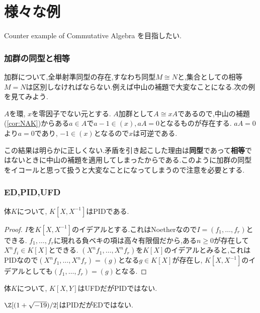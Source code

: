 \part[Appendix \thepart, Various Example]{様々な例}

Counter example of Commutative Algebra を目指したい.

\section{加群の同型と相等}

加群について,全単射準同型の存在,すなわち同型$M\cong N$と,集合としての相等$M=N$は区別しなければならない.例えば中山の補題で大変なことになる.次の例を見てみよう.

\begin{ex}
	$A$を環, $x$を零因子でない元とする. $A$加群として$A\cong xA$であるので,中山の補題(\ref{cor:NAK})からある$a\in A$で$a-1\in(x),aA=0$となるものが存在する. $aA=0$より$a=0$であり, $-1\in (x)$となるので$x$は可逆である.
\end{ex}

この結果は明らかに正しくない.矛盾を引き起こした理由は\textbf{同型}であって\textbf{相等}ではないときに中山の補題を適用してしまったからである.このように加群の同型をイコールと思って扱うと大変なことになってしまうので注意を必要とする.
\section{ED,PID,UFD}
\begin{surex}
	体$K$について, $K[X,X^{-1}]$はPIDである.
\end{surex}

\begin{proof}
	$I$を$K[X,X^{-1}]$のイデアルとする.これはNoetherなので$I=(f_1,\dots,f_r)$とできる. $f_1,\dots,f_r$に現れる負ベキの項は高々有限個だから,ある$n\geq0$が存在して$X^nf_i\in K[X]$とできる. $(X^nf_1,\dots,X^nf_r)$を$K[X]$のイデアルとみると,これはPIDなので$(X^nf_1,\dots,X^nf_r)=(g)$となる$g\in K[X]$が存在し, $K[X,X^{-1}]$のイデアルとしても$(f_1,\dots,f_r)=(g)$となる.
\end{proof}
\begin{surex}[UFDだがPIDでない環]
	体$K$について, $K[X,Y]$はUFDだがPIDではない.
\end{surex}

\begin{surex}[PIDだがEDでない環]
	$\Z[(1+\sqrt{-19})/2]$はPIDだがEDではない.
\end{surex}

